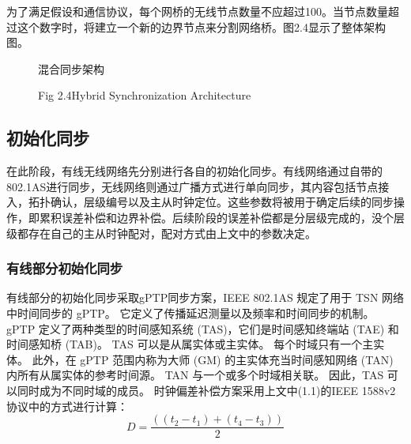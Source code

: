 \documentclass[UTF8,a4paper,12pt]{ctexart}
\numberwithin{equation}{section}
\begin{document}
	为了满足假设和通信协议，每个网桥的无线节点数量不应超过100。当节点数量超过这个数字时，将建立一个新的边界节点来分割网络桥。图2.4显示了整体架构图。
	
	\begin{figure}[htb]
		\caption{混合同步架构}
		\vspace{-10pt}
		\caption*{Fig 2.4\quad Hybrid Synchronization Architecture}
	\end{figure}
	
	\subsection{初始化同步}
	
	在此阶段，有线无线网络先分别进行各自的初始化同步。有线网络通过自带的802.1AS进行同步，无线网络则通过广播方式进行单向同步，其内容包括节点接入，拓扑确认，层级编号以及主从时钟定位。这些参数将被用于确定后续的同步操作，即累积误差补偿和边界补偿。后续阶段的误差补偿都是分层级完成的，没个层级都存在自己的主从时钟配对，配对方式由上文中的参数决定。
	\subsubsection{有线部分初始化同步}
	
	有线部分的初始化同步采取gPTP同步方案，IEEE 802.1AS 规定了用于 TSN 网络中时间同步的 gPTP。 它定义了传播延迟测量以及频率和时间同步的机制。 gPTP 定义了两种类型的时间感知系统 (TAS)，它们是时间感知终端站 (TAE) 和时间感知桥 (TAB)。 TAS 可以是从属实体或主实体。 每个时域只有一个主实体。 此外，在 gPTP 范围内称为大师 (GM) 的主实体充当时间感知网络 (TAN) 内所有从属实体的参考时间源。 TAN 与一个或多个时域相关联。 因此，TAS 可以同时成为不同时域的成员。
	时钟偏差补偿方案采用上文中(1.1)的IEEE 1588v2协议中的方式进行计算：
	\begin{equation}
		D = \frac{((t_2-t_1)+(t_4-t_3))}{2} 
	\end{equation}
\end{document}
